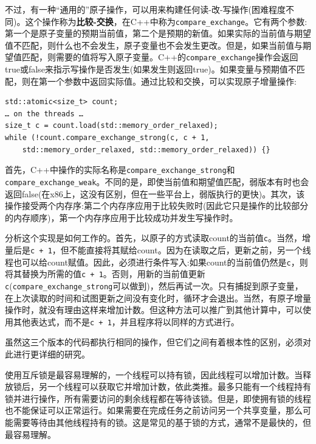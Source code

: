 不过，有一种“通用的”原子操作，可以用来构建任何读-改-写操作(困难程度不同)。这个操作称为\textbf{比较-交换}，在C++中称为\texttt{compare\_exchange}。它有两个参数:第一个是原子变量的预期当前值，第二个是预期的新值。如果实际的当前值与期望值不匹配，则什么也不会发生，原子变量也不会发生更改。但是，如果当前值与期望值匹配，则需要的值将写入原子变量。C++的\texttt{compare\_exchange}操作会返回true或false来指示写操作是否发生(如果发生则返回true)。如果变量与预期值不匹配，则在第一个参数中返回实际值。通过比较和交换，可以实现原子增量操作:

\begin{lstlisting}[style=styleCXX]
std::atomic<size_t> count;
… on the threads …
size_t c = count.load(std::memory_order_relaxed);
while (!count.compare_exchange_strong(c, c + 1,
	std::memory_order_relaxed, std::memory_order_relaxed)) {}
\end{lstlisting}

首先，C++中操作的实际名称是\texttt{compare\_exchange\_strong}和\texttt{compare\_exchange\_weak}。不同的是，即使当前值和期望值匹配，弱版本有时也会返回false(在x86上，这没有区别，但在一些平台上，弱版执行的更快)。其次，该操作接受两个内存序:第二个内存序应用于比较失败时(因此它只是操作的比较部分的内存顺序)，第一个内存序应用于比较成功并发生写操作时。

分析这个实现是如何工作的。首先，以原子的方式读取count的当前值\texttt{c}。当然，增量后是\texttt{c + 1}，但不能直接将其赋给count。因为在读取之后，更新之前，另一个线程也可以给count赋值。因此，必须进行条件写入:如果count的当前值仍然是\texttt{c}，则将其替换为所需的值\texttt{c + 1}。否则，用新的当前值更新\texttt{c}(\texttt{compare\_exchange\_strong}可以做到)，然后再试一次。只有捕捉到原子变量，在上次读取的时间和试图更新之间没有变化时，循环才会退出。当然，有原子增量操作时，就没有理由这样来增加计数。但这种方法可以推广到其他计算中，可以使用其他表达式，而不是\texttt{c + 1}，并且程序将以同样的方式进行。

虽然这三个版本的代码都执行相同的操作，但它们之间有着根本性的区别，必须对此进行更详细的研究。


使用互斥锁是最容易理解的，一个线程可以持有锁，因此线程可以增加计数。当释放锁后，另一个线程可以获取它并增加计数，依此类推。最多只能有一个线程持有锁并进行操作，所有需要访问的剩余线程都在等待该锁。但是，即使拥有锁的线程也不能保证可以正常运行。如果需要在完成任务之前访问另一个共享变量，那么可能需要等待由其他线程持有的锁。这是常见的基于锁的方式，通常不是最快的，但最容易理解。

